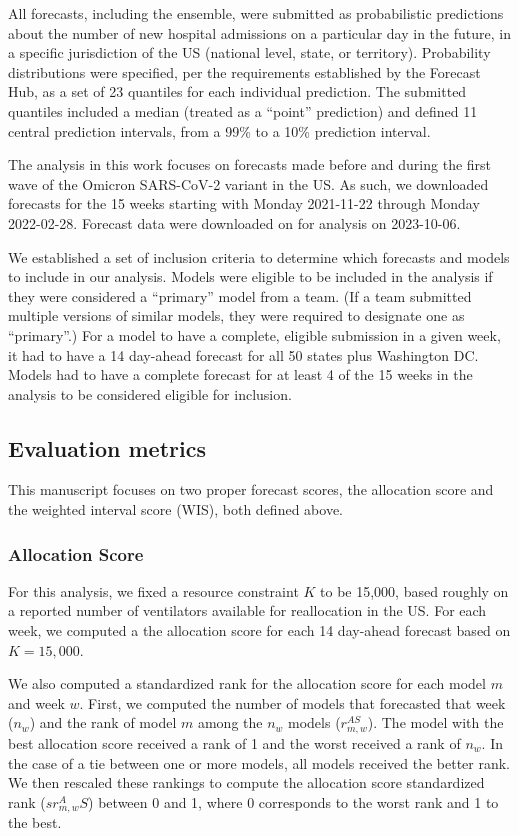 \documentclass{article}\usepackage[]{graphicx}\usepackage[]{xcolor}
\begin{document}
All forecasts, including the ensemble, were submitted as probabilistic predictions about the number of new hospital admissions on a particular day in the future, in a specific jurisdiction of the US (national level, state, or territory).
Probability distributions were specified, per the requirements established by the Forecast Hub, as a set of 23 quantiles for each individual prediction.
The submitted quantiles included a median (treated as a ``point'' prediction) and defined 11 central prediction intervals, from a 99\% to a 10\% prediction interval.

The analysis in this work focuses on forecasts made before and during the first wave of the Omicron SARS-CoV-2 variant in the US.
As such, we downloaded forecasts for the 15 weeks starting with Monday 2021-11-22 through Monday 2022-02-28.
Forecast data were downloaded on for analysis on 2023-10-06.


We established a set of inclusion criteria to determine which forecasts and models to include in our analysis.
Models were eligible to be included in the analysis if they were considered a ``primary'' model from a team. (If a team submitted multiple versions of similar models, they were required to designate one as ``primary''.)
For a model to have a complete, eligible submission in a given week, it had to have a 14 day-ahead forecast for all 50 states plus Washington DC.
Models had to have a complete forecast for at least 4 of the 15 weeks in the analysis to be considered eligible for inclusion.

\subsection{Evaluation metrics}

This manuscript focuses on two proper forecast scores, the allocation score and the weighted interval score (WIS), both defined above.

\subsubsection{Allocation Score}

For this analysis, we fixed a resource constraint $K$ to be 15,000, based roughly on a reported number of ventilators available for reallocation in the US.\citep{ajao_assessing_2015}
For each week, we computed a the allocation score for each 14 day-ahead forecast based on $K=15,000$.

We also computed a standardized rank for the allocation score for each model $m$ and week $w$.
First, we computed the number of models that forecasted that week ($n_w$) and the rank of model $m$ among the $n_w$ models ($r_{m,w}^{AS}$).
The model with the best allocation score received a rank of 1 and the worst received a rank of $n_w$.
In the case of a tie between one or more models, all models received the better rank.
We then rescaled these rankings to compute the allocation score standardized rank ($sr_{m,w}^AS$) between 0 and 1, where 0 corresponds to the worst rank and 1 to the best.
\end{document}
